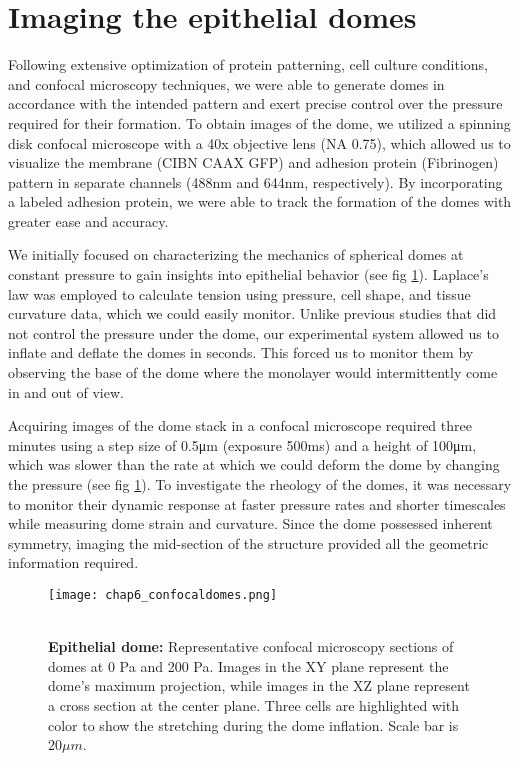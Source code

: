 \hypertarget{imaging-the-epithelial-domes}{%
\section{Imaging the epithelial
domes}\label{imaging-the-epithelial-domes}}

Following extensive optimization of protein patterning, cell culture conditions, and confocal microscopy techniques, we were able to generate domes in accordance with the intended pattern and exert precise control over the pressure required for their formation. To obtain images of the dome, we utilized a spinning disk confocal microscope with a 40x objective lens (NA 0.75), which allowed us to visualize the membrane (CIBN CAAX GFP) and adhesion protein (Fibrinogen) pattern in separate channels (488\unit{\nm} and 644\unit{\nm}, respectively). By incorporating a labeled adhesion protein, we were able to track the formation of the domes with greater ease and accuracy.

We initially focused on characterizing the mechanics of spherical domes at constant pressure to gain insights into epithelial behavior (see fig \ref{fig_6_6}). Laplace's law was employed to calculate tension using pressure, cell shape, and tissue curvature data, which we could easily monitor. Unlike previous studies that did not control the pressure under the dome, our experimental system allowed us to inflate and deflate the domes in seconds. This forced us to monitor them by observing the base of the dome where the monolayer would intermittently come in and out of view.

Acquiring images of the dome stack in a confocal microscope required three minutes using a step size of 0.5\unit{\um} (exposure 500\unit{\ms}) and a height of 100\unit{\um}, which was slower than the rate at which we could deform the dome by changing the pressure (see fig \ref{fig_6_6}). To investigate the rheology of the domes, it was necessary to monitor their dynamic response at faster pressure rates and shorter timescales while measuring dome strain and curvature. Since the dome possessed inherent symmetry, imaging the mid-section of the structure provided all the geometric information required.

\begin{figure}[t!]
	\centering
	\texttt{[image: chap6\_confocaldomes.png]}
	\caption{\\ \textbf{Epithelial dome:} Representative confocal microscopy sections of domes at 0 Pa and 200 Pa. Images in the XY plane represent the dome's maximum projection, while images in the XZ plane represent a cross section at the center plane. Three cells are highlighted with color to show the stretching during the dome inflation. Scale bar is $20 \mu m$.
	} \label{fig_6_6}
\end{figure}

